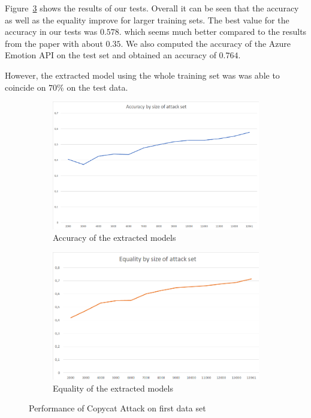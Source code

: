 \documentclass[a4paper,11pt]{article}
\begin{document}
        Figure~\ref{fig:performance-azure} shows the results of our tests. Overall it can be seen that the accuracy as well as the equality improve for larger training sets. The best value for the accuracy in our tests was $0.578$. which seems much better compared to the results from the paper with about $0.35$. We also computed the accuracy of the Azure Emotion API on the test set and obtained an accuracy of $0.764$.
        
        However, the extracted model using the whole training set was was able to coincide on $70\%$ on the test data. 
        
        \begin{figure}[h!]
            \centering
            \begin{subfigure}[c]{0.49\textwidth}
                \centering
                \includegraphics[width=1\textwidth]{exercise_3/paper/images/accuracy_copy_Azure.png}
                \caption{Accuracy of the extracted models}
                \label{fig:Accuracy_Azure}
            \end{subfigure}
            \begin{subfigure}[c]{0.49\textwidth}
                \centering
                \includegraphics[width=1\textwidth]{exercise_3/paper/images/equality_copy_Azure.png}
                \caption{Equality of the extracted models}
                \label{fig:Equality_Azure}
            \end{subfigure}
            \caption{Performance of Copycat Attack on first data set}
            \label{fig:performance-azure}
        \end{figure}
        
\end{document}
